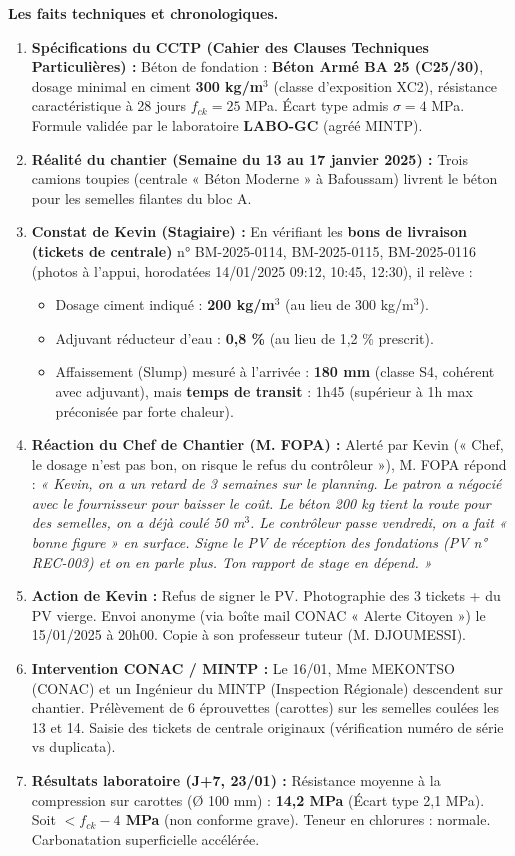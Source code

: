 \documentclass[11pt]{article}
\begin{document}
\textbf{Les faits techniques et chronologiques.}
\begin{enumerate}
    \item \textbf{Spécifications du CCTP (Cahier des Clauses Techniques Particulières) :} Béton de fondation : \textbf{Béton Armé BA 25 (C25/30)}, dosage minimal en ciment \textbf{300 kg/m$^3$} (classe d'exposition XC2), résistance caractéristique à 28 jours $f_{ck} = 25$ MPa. Écart type admis $\sigma = 4$ MPa. Formule validée par le laboratoire \textbf{LABO-GC} (agréé MINTP).
    \item \textbf{Réalité du chantier (Semaine du 13 au 17 janvier 2025) :} Trois camions toupies (centrale « Béton Moderne » à Bafoussam) livrent le béton pour les semelles filantes du bloc A.
    \item \textbf{Constat de Kevin (Stagiaire) :} En vérifiant les \textbf{bons de livraison (tickets de centrale)} n° BM-2025-0114, BM-2025-0115, BM-2025-0116 (photos à l'appui, horodatées 14/01/2025 09:12, 10:45, 12:30), il relève :
    \begin{itemize}
        \item Dosage ciment indiqué : \textbf{200 kg/m$^3$} (au lieu de 300 kg/m$^3$).
        \item Adjuvant réducteur d'eau : \textbf{0,8 \%} (au lieu de 1,2 \% prescrit).
        \item Affaissement (Slump) mesuré à l'arrivée : \textbf{180 mm} (classe S4, cohérent avec adjuvant), mais \textbf{temps de transit} : 1h45 (supérieur à 1h max préconisée par forte chaleur).
    \end{itemize}
    \item \textbf{Réaction du Chef de Chantier (M. FOPA) :} Alerté par Kevin (« Chef, le dosage n'est pas bon, on risque le refus du contrôleur »), M. FOPA répond : \emph{« Kevin, on a un retard de 3 semaines sur le planning. Le patron a négocié avec le fournisseur pour baisser le coût. Le béton 200 kg tient la route pour des semelles, on a déjà coulé 50 m$^3$. Le contrôleur passe vendredi, on a fait « bonne figure » en surface. Signe le PV de réception des fondations (PV n° REC-003) et on en parle plus. Ton rapport de stage en dépend. »}
    \item \textbf{Action de Kevin :} Refus de signer le PV. Photographie des 3 tickets + du PV vierge. Envoi anonyme (via boîte mail CONAC « Alerte Citoyen ») le 15/01/2025 à 20h00. Copie à son professeur tuteur (M. DJOUMESSI).
    \item \textbf{Intervention CONAC / MINTP :} Le 16/01, Mme MEKONTSO (CONAC) et un Ingénieur du MINTP (Inspection Régionale) descendent sur chantier. Prélèvement de 6 éprouvettes (carottes) sur les semelles coulées les 13 et 14. Saisie des tickets de centrale originaux (vérification numéro de série vs duplicata).
    \item \textbf{Résultats laboratoire (J+7, 23/01) :} Résistance moyenne à la compression sur carottes (Ø 100 mm) : \textbf{14,2 MPa} (Écart type 2,1 MPa). Soit \textbf{$< f_{ck} - 4$ MPa} (non conforme grave). Teneur en chlorures : normale. Carbonatation superficielle accélérée.
\end{enumerate}
\end{document}
